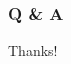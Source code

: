 \documentclass{beamer}
\begin{document}
\begin{frame}
    \frametitle{Q \& A}
\end{frame}

\begin{frame}
    \begin{center}
        {\Huge\calligra Thanks!}
    \end{center}
\end{frame}
\end{document}
